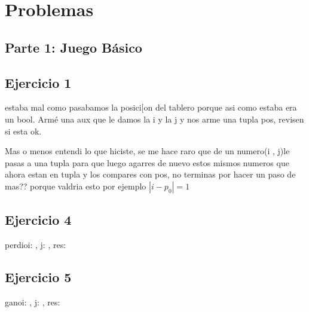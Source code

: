 \documentclass[a4paper]{article}
\begin{document}
\section{Problemas}


\subsection*{Parte 1: Juego Básico}


\subsection*{Ejercicio 1}

{\color{red} estaba mal como pasabamos la posici[on del tablero porque asi como estaba era un bool. Armé una aux que le damos la i y la j y nos arme una tupla pos, revisen si esta ok.}


{\color{blue} Mas o menos entendi lo que hiciste, se me hace raro que de un numero(i , j)le pasas a una tupla para que luego agarres de nuevo estos  mismos numeros que ahora estan en tupla y los compares con pos, no terminas por hacer un paso de mas?? porque valdria esto por ejemplo 
$|i - p_{0}| = 1$}

\subsection{Ejercicio 4}

\begin{proc}{perdio}{\In i: \tablero, \In j: \jugadas, \Out res: \bool}{}
\end{proc}



\subsection{Ejercicio 5}
\begin{proc}{gano}{\In i: \tablero, \In j: \jugadas, \Out res: \bool}{}
\end{proc}
\end{document}
